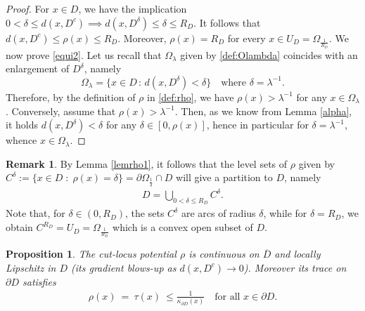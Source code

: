 \documentclass[reqno,11pt]{amsart}
\newtheorem{proposition}[theorem]{Proposition}
\theoremstyle{definition}
\newtheorem{remark}[theorem]{Remark}
\numberwithin{equation}{section}
\def\ov{\overline}
\newcommand{\1}{{{\bf 1}\kern-0,28em\rm l}}
\def\sepa{\; : \;}
\def\O{\Omega}
\def\l{\lambda}
\begin{document}
\begin{proof} For $x\in D$, we have the implication $0<\delta \le d(x,D^c) \implies   d(x,D^\delta) \le \delta \le R_D $.
It follows that
$d(x,D^c) \le \rho(x) \le R_D$. Moreover, $\rho(x) = R_D$ for every $x\in U_D=\Omega_{\frac {1}{R_D}}$.
We now prove \eqref{equi2}. Let us recall that $\O_\l$ given by \eqref{def:Olambda} coincides with an enlargement of $D^\delta$, namely 
$$\O_\l= \{x\in D \, :\, d(x, D^\delta)<\delta\} \quad \text{where $\delta = \l^{-1}$} .$$ 
Therefore, by the definition of $\rho$ in \eqref{def:rho},  we have  $\rho(x) >\l^{-1} $ for any $x\in \O_\l$. Conversely, assume that $\rho(x) >\l^{-1} $. Then, as we know from 
Lemma \ref{alpha}, it holds  $d(x, D^\delta)<\delta$ for any $\delta \in [0,\rho(x)]$, hence in particular for $\delta=\l^{-1}$, whence $x\in \O_\l$.

\end{proof}

\begin{remark}\label{rhoAlp}
By Lemma \ref{lemrho1}, it follows that the level sets of $\rho$  given by $C^\delta:=\{x\in D \sepa \rho(x) =\delta\}=\partial\Omega_{\frac{1}{\delta}}\cap D$ will give a partition to $D$, namely
\begin{align*}
D = \bigcup_{0<\delta \le R_D} C^\delta .
\end{align*}
Note that, for $\delta \in (0,R_D)$,  the sets  $C^\delta$  are arcs of radius $\delta$, while for $\delta=R_D$, we obtain 
 $C^{R_D} = U_D =\O_{\frac1{R_D}}$ which is a convex open subset of $D$.  
\end{remark}




\begin{proposition} \label{Lip-rho} The cut-locus potential $\rho$ is continuous on $\ov D$ and locally Lipschitz in $D$  (its gradient blows-up as $d(x, D^c)\to 0$). Moreover its trace on $\partial D$ satisfies
\begin{align}\label{rho-partialD}
\rho(x) \ =\ \tau(x)\ \le \frac1{\kappa_{\partial D}(x)} \quad \text{for all $x\in \partial D$}.
\end{align}
\end{proposition}
\end{document}
